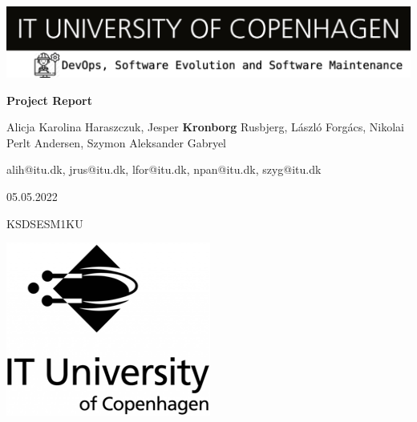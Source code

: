 \begin{titlepage}
   \begin{center}
   
    \includegraphics[width=\textwidth]{images/devops_banner.png} \\
    
    \vspace{1cm}
    
    \huge{\textbf{Project Report \\ }}
    
    \vspace*{1.5cm}
    
    \Large{Alicja Karolina Haraszczuk, Jesper \textbf{Kronborg} Rusbjerg}, László Forgács, Nikolai Perlt Andersen, Szymon Aleksander Gabryel \\
    
    \vspace{0.5cm}
    
    \Large{alih@itu.dk, jrus@itu.dk, lfor@itu.dk, npan@itu.dk, szyg@itu.dk} \\
    
    \vspace{1.5cm}
    
    \Large{05.05.2022} \\
    
    \vspace{0.2cm}
    
    \Large{KSDSESM1KU} \\
    
    \vspace{1.5cm}
    
    \includegraphics[]{images/itu_logo.png}
    
   \end{center}
\end{titlepage}